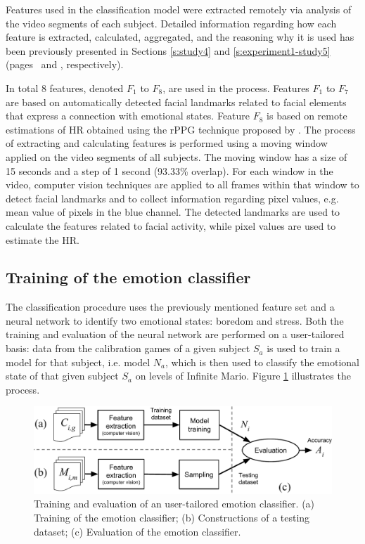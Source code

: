 Features used in the classification model were extracted remotely via analysis of the video segments of each subject. Detailed information regarding how each feature is extracted, calculated, aggregated, and the reasoning why it is used has been previously presented in Sections \ref{s:study4} and \ref{s:experiment1-study5} (pages \pageref{s:study4}\ and \pageref{s:experiment1-study5}, respectively).

In total 8 features, denoted $F_1$ to $F_8$, are used in the process. Features $F_1$ to $F_7$ are based on automatically detected facial landmarks related to facial elements that express a connection with emotional states. Feature $F_8$ is based on remote estimations of HR obtained using the rPPG technique proposed by \textcite{poh2011advancements}. The process of extracting and calculating features is performed using a moving window applied on the video segments of all subjects. The moving window has a size of 15 seconds and a step of 1 second (93.33\% overlap). For each window in the video, computer vision techniques are applied to all frames within that window to detect facial landmarks and to collect information regarding pixel values, e.g. mean value of pixels in the blue channel. The detected landmarks are used to calculate the features related to facial activity, while pixel values are used to estimate the HR.

\subsection{Training of the emotion classifier}

The classification procedure uses the previously mentioned feature set and a neural network to identify two emotional states: boredom and stress. Both the training and evaluation of the neural network are performed on a user-tailored basis: data from the calibration games of a given subject $S_a$ is used to train a model for that subject, i.e. model $N_a$, which is then used to classify the emotional state of that given subject $S_a$ on levels of Infinite Mario. Figure \ref{fig:experiment2-training-evaluation} illustrates the process.

\begin{figure}[ht]
    \centering
    \includegraphics[width=\textwidth]{figures/experiment2-training-evaluation}
    \caption{Training and evaluation of an user-tailored emotion classifier. (a) Training of the emotion classifier; (b) Constructions of a testing dataset; (c) Evaluation of the emotion classifier.}
    \label{fig:experiment2-training-evaluation}
\end{figure}

